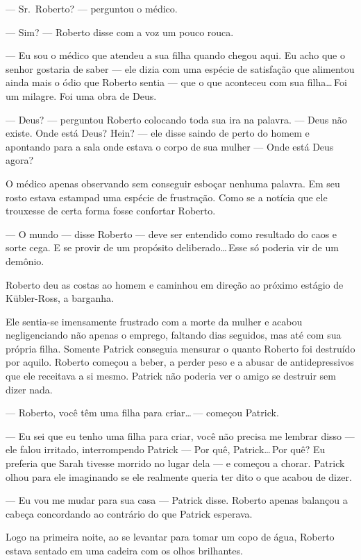 --- Sr.~Roberto? --- perguntou o médico.

--- Sim? --- Roberto disse com a voz um pouco rouca.

--- Eu sou o médico que atendeu a sua filha quando chegou aqui. Eu acho que o senhor gostaria de saber --- ele dizia com uma espécie de satisfação que alimentou ainda mais o ódio que Roberto sentia --- que o que aconteceu com sua filha\ldots\,Foi um milagre. Foi uma obra de Deus.

--- Deus? --- perguntou Roberto colocando toda sua ira na palavra. --- Deus não existe. Onde está Deus? Hein? --- ele disse saindo de perto do homem e apontando para a sala onde estava o corpo de sua mulher --- Onde está Deus agora?

O médico apenas  observando\mudanca{,} sem conseguir esboçar nenhuma palavra. Em seu rosto estava estampad uma espécie de frustração. Como se a notícia que ele trouxesse de certa forma fosse confortar Roberto.

--- O mundo --- disse Roberto --- deve ser entendido como resultado do caos e sorte cega. E se provir de um propósito deliberado\ldots\,Esse só poderia vir de um demônio.

Roberto deu as costas ao homem e caminhou em direção ao próximo estágio de Kübler-Ross, a barganha.

Ele sentia-se imensamente frustrado com a morte da mulher e acabou negligenciando não apenas o emprego, faltando dias seguidos, mas até com sua própria filha. Somente Patrick conseguia mensurar o quanto Roberto foi destruído por aquilo. Roberto começou a beber, a perder peso e a abusar de antidepressivos que ele receitava a si mesmo. Patrick não poderia ver o amigo se destruir sem dizer nada.

--- Roberto, você têm uma filha para criar\ldots\,--- começou Patrick.

--- Eu sei que eu tenho uma filha para criar, você não precisa me lembrar disso --- ele falou irritado, interrompendo Patrick --- Por quê, Patrick\ldots\,Por quê? Eu preferia que Sarah tivesse morrido no lugar dela --- e começou a chorar. Patrick olhou para ele imaginando se ele realmente queria ter dito o que acabou de dizer.

--- Eu vou me mudar para sua casa --- Patrick disse. Roberto apenas balançou a cabeça concordando\mudanca{,} ao contrário do que Patrick esperava.

Logo na primeira noite, ao se levantar para tomar um copo de água, Roberto estava sentado em uma cadeira com os olhos brilhantes.

